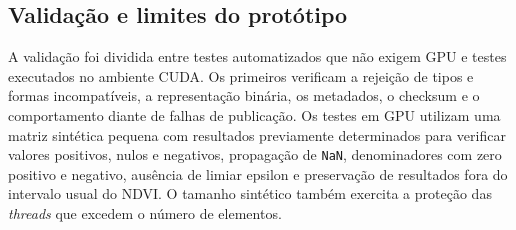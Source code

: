 \documentclass[tcc,capa]{texufpel}
\begin{document}
\subsection{Validação e limites do protótipo}

A validação foi dividida entre testes automatizados que não exigem GPU e testes executados no
ambiente CUDA. Os primeiros verificam a rejeição de tipos e formas incompatíveis,
a representação binária, os metadados, o checksum e o comportamento diante de
falhas de publicação. Os testes em GPU utilizam uma matriz sintética pequena com
resultados previamente determinados para verificar valores positivos, nulos e
negativos, propagação de \texttt{NaN}, denominadores com zero positivo e negativo,
ausência de limiar epsilon e preservação de resultados fora do intervalo usual do
NDVI. O tamanho sintético também exercita a proteção das \textit{threads} que
excedem o número de elementos.




\end{document}
